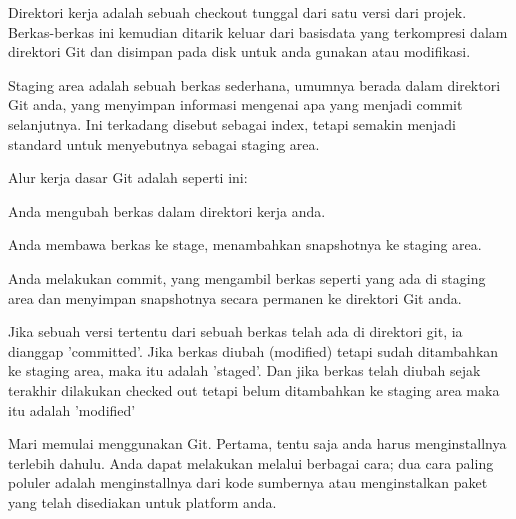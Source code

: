 {{\vspace{\baselineskip}
\noindent 
{\fontsize{14pt}{14pt}\selectfont Direktori kerja adalah sebuah checkout tunggal dari satu versi dari projek. Berkas-berkas ini kemudian ditarik keluar dari basisdata yang terkompresi dalam direktori Git dan disimpan pada disk untuk anda gunakan atau modifikasi. \\} \par

\vspace{\baselineskip}
\noindent 
{\fontsize{14pt}{14pt}\selectfont Staging area adalah sebuah berkas sederhana, umumnya berada dalam direktori Git anda, yang menyimpan informasi mengenai apa yang menjadi commit selanjutnya. Ini terkadang disebut sebagai index, tetapi semakin menjadi standard untuk menyebutnya sebagai staging area. \\} \par

\vspace{\baselineskip}
\noindent 
{\fontsize{14pt}{14pt}\selectfont Alur kerja dasar Git adalah seperti ini: \\} \par

\vspace{\baselineskip}
\noindent 
{\fontsize{14pt}{14pt}\selectfont Anda mengubah berkas dalam direktori kerja anda. \\} \par

\vspace{\baselineskip}
\noindent 
{\fontsize{14pt}{14pt}\selectfont Anda membawa berkas ke stage, menambahkan snapshotnya ke staging area. \\} \par

\vspace{\baselineskip}
\noindent 
{\fontsize{14pt}{14pt}\selectfont Anda melakukan commit, yang mengambil berkas seperti yang ada di staging area dan menyimpan snapshotnya secara permanen ke direktori Git anda. \\} \par

\vspace{\baselineskip}
\noindent 
{\fontsize{14pt}{14pt}\selectfont Jika sebuah versi tertentu dari sebuah berkas telah ada di direktori git, ia dianggap 'committed'. Jika berkas diubah (modified) tetapi sudah ditambahkan ke staging area, maka itu adalah 'staged'. Dan jika berkas telah diubah sejak terakhir dilakukan checked out tetapi belum ditambahkan ke staging area maka itu adalah 'modified' \\} \par
\vspace{14pt}
\vspace{14pt}
\noindent 
{\fontsize{14pt}{14pt}\selectfont Mari memulai menggunakan Git. Pertama, tentu saja anda harus menginstallnya terlebih dahulu. Anda dapat melakukan melalui berbagai cara; dua cara paling poluler adalah menginstallnya dari kode sumbernya atau menginstalkan paket yang telah disediakan untuk platform anda. \\} \par

}}
